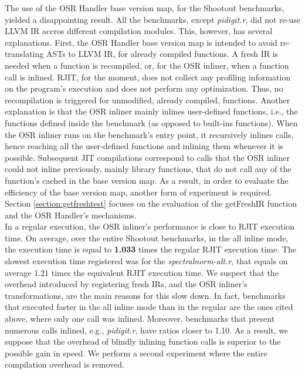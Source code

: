 The use of the OSR Handler base version map, for the Shootout benchmarks, yielded a disappointing result.
All the benchmarks, except \textit{pidigit.r}, did not re-use LLVM IR accros different compilation modules.
This, however, has several explanations.
First, the OSR Handler base version map is intended to avoid re-translating ASTs to LLVM IR, for already compiled functions.
A fresh IR is needed when a function is recompiled, or, for the OSR inliner, when a function call is inlined.
RJIT, for the moment, does not collect any profiling information on the program's execution and does not perform any optimization. 
Thus, no recompilation is triggered for unmodified, already compiled, functions.
Another explanation is that the OSR inliner mainly inlines user-defined functions, i.e., the functions defined inside the benchmark (as opposed to built-ins functions).
When the OSR inliner runs on the benchmark's entry point, it recursively inlines calls, hence reaching all the user-defined functions and inlining them whenever it is possible.
Subsequent JIT compilations correspond to calls that the OSR inliner could not inline previously, mainly library functions, that do not call any of the function's cached in the base version map.
As a result, in order to evaluate the efficiency of the base version map, another form of experiment is required.
Section \ref{section:getfreshtest} focuses on the evaluation of the getFreshIR function and the OSR Handler's mechanisms.\\

In a regular execution, the OSR inliner's performance is close to RJIT execution time.
On average, over the entire Shootout benchmarks, in the all inline mode, the execution time is equal to \textbf{1.033} times the regular RJIT execution time.
The slowest execution time registered was for the \textit{spectralnorm-alt.r}, that equals on average 1.21 times the equivalent RJIT execution time.
We suspect that the overhead introduced by registering fresh IRs, and the OSR inliner's transformations, are the main reasons for this slow down.
In fact, benchmarks that executed faster in the all inline mode than in the regular are the ones cited above, where only one call was inlined.
Moreover, benchmarks that present numerous calls inlined, e.g., \textit{pidigit.r}, have ratios closer to 1.10.
As a result, we suppose that the overhead of blindly inlining function calls is superior to the possible gain in speed. 
We perform a second experiment where the entire compilation overhead is removed.\\

